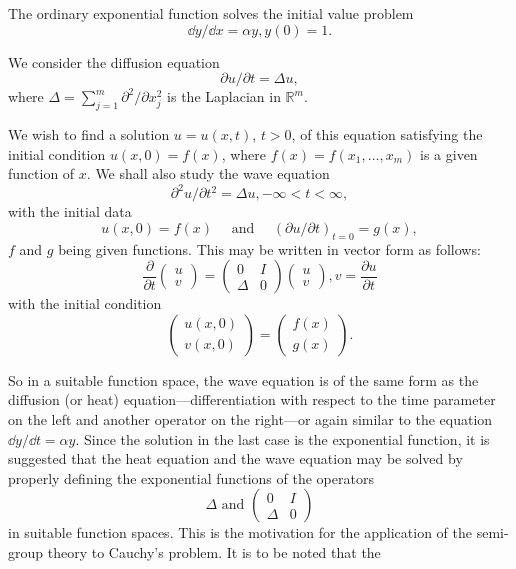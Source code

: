 \label{chap:XIV}

The ordinary exponential function solves the initial value problem 
\[
\dd y / \dd x = \alpha y, y (0) = 1.
\]

We consider the diffusion equation 
\[
\partial u/\partial t=\Delta u,
\]
where $\Delta=\sum_{j=1}^m\partial^2/\partial x_j^2$ is the Laplacian in $\mathbb R^m$.

We wish to find a solution $u = u(x, t)$, $t > 0$, of this equation satisfying the initial condition $u(x, 0) = f(x)$, where $f(x) = f(x_{1}, \ldots, x_{m})$ is a given function of $x$. We shall also study the wave equation 
\[
\partial^{2} u / \partial t ^{2} = \Delta u, - \infty < t < \infty ,
\]
with the initial data 
\[
u (x, 0) = f (x) \quad \text{ and } \quad (\partial u / \partial t) _{t=0} = g (x),
\]
$f$ and $g$ being given functions. This may be written in vector form as follows: 
\[
\frac {\partial}{\partial t} \begin{pmatrix}u \\ v\end{pmatrix} = \begin{pmatrix}0 & I \\ \Delta & 0\end{pmatrix} \begin{pmatrix}u \\ v\end{pmatrix}, v = \frac {\partial u}{\partial t}
\]
with the initial condition 
\[
\begin{pmatrix}u (x, 0) \\ v (x, 0)\end{pmatrix} = \begin{pmatrix}f (x) \\ g (x)\end{pmatrix}.
\]

So in a suitable function space, the wave equation is of the same form as the diffusion (or heat) equation---differentiation with respect to the time parameter on the left and another operator on the right---or again similar to the equation $\dd y/\dd t = \alpha y$. Since the solution in the last case is the exponential function, it is suggested that the heat equation and the wave equation may be solved by properly defining the exponential functions of the operators 
\[
\Delta \text{ and } \begin{pmatrix}0 & I \\ \Delta & 0\end{pmatrix}
\]
in suitable function spaces. This is the motivation for the application of the semi-group theory to Cauchy's problem. It is to be noted that the 

